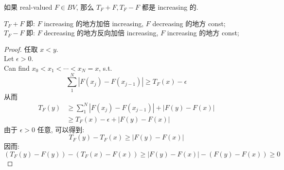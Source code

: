 \documentclass[lang=cn,11pt]{elegantbook}
\begin{document}
\begin{lemma}
   如果 real-valued  $F \in BV$, 那么 $T_F + F, T_F - F$ 都是 increasing 的.
\end{lemma}
\begin{remark}
    $T_F + F$ 即: $F$ increasing 的地方加倍 increasing, $F$ decreasing 的地方 const;\\
     $T_F - F$ 即: $F$ decreasing 的地方反向加倍 increasing, $F$ increasing 的地方 const;
\end{remark}
\begin{proof}
    任取 $x<y$.\\
    Let $\epsilon > 0$.\\
    Can find $x_0 <  x_ 1 < \cdots < x_N = x$, s.t. \[
    \sum_{1}^N |F(x_j) - F(x_{j-1}) | \geq T_F(x) - \epsilon
    \] 从而 
    \begin{align*}
T_F(y)  &\geq    \sum_{1}^N |F(x_j) - F(x_{j-1}) |  + |F(y) - F(x)| \\
&\geq T_F(x) - \epsilon + |F(y) - F(x)|
    \end{align*}
由于 $\epsilon > 0$ 任意, 可以得到: \[
 T_F(y) -  T_F(x)\geq  |F(y) - F(x)|
\]
因而: \[
( T_F(y)  - F(y)) -  (T_F(x)  -F(x)) \geq  |F(y) - F(x)| - (F(y) - F(x)) \geq 0
\]
\end{proof} 
\end{document}
